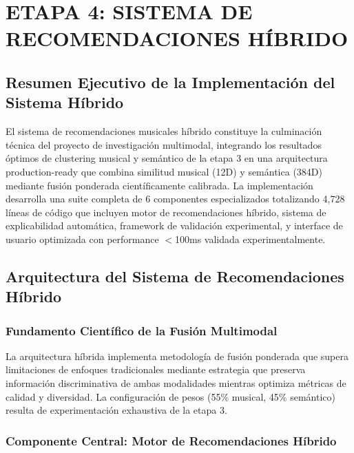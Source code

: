 \documentclass[12pt,a4paper]{report}
\begin{document}
\chapter{ETAPA 4: SISTEMA DE RECOMENDACIONES HÍBRIDO}
\label{chap:recomendaciones}

\section{Resumen Ejecutivo de la Implementación del Sistema Híbrido}

El sistema de recomendaciones musicales híbrido constituye la culminación técnica del proyecto de investigación multimodal, integrando los resultados óptimos de clustering musical y semántico de la etapa 3 en una arquitectura production-ready que combina similitud musical (12D) y semántica (384D) mediante fusión ponderada científicamente calibrada. La implementación desarrolla una suite completa de 6 componentes especializados totalizando 4,728 líneas de código que incluyen motor de recomendaciones híbrido, sistema de explicabilidad automática, framework de validación experimental, y interface de usuario optimizada con performance $<$100ms validada experimentalmente.

\section{Arquitectura del Sistema de Recomendaciones Híbrido}

\subsection{Fundamento Científico de la Fusión Multimodal}

La arquitectura híbrida implementa metodología de fusión ponderada que supera limitaciones de enfoques tradicionales mediante estrategia que preserva información discriminativa de ambas modalidades mientras optimiza métricas de calidad y diversidad. La configuración de pesos (55\% musical, 45\% semántico) resulta de experimentación exhaustiva de la etapa 3.

\subsection{Componente Central: Motor de Recomendaciones Híbrido}
\end{document}
